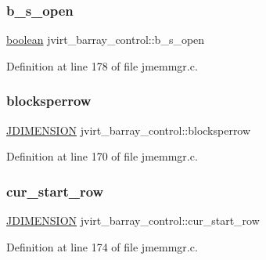 \mbox{\label{structjvirt__barray__control_a5b588561840b293882bcf69e690962b2}} 
\subsubsection{\texorpdfstring{b\_s\_open}{b\_s\_open}}
{\footnotesize\ttfamily \mbox{\hyperlink{jmorecfg_8h_a7c6368b321bd9acd0149b030bb8275ed}{boolean}} jvirt\+\_\+barray\+\_\+control\+::b\+\_\+s\+\_\+open}



Definition at line 178 of file jmemmgr.\+c.

\mbox{\label{structjvirt__barray__control_a6c148bce80b027c114ec7d37221cd175}} 
\subsubsection{\texorpdfstring{blocksperrow}{blocksperrow}}
{\footnotesize\ttfamily \mbox{\hyperlink{jmorecfg_8h_a04ed4674f6f1d0d50ec241531e38274f}{J\+D\+I\+M\+E\+N\+S\+I\+ON}} jvirt\+\_\+barray\+\_\+control\+::blocksperrow}



Definition at line 170 of file jmemmgr.\+c.

\mbox{\label{structjvirt__barray__control_ae1e7828cda2f39e8ffdd7e0cc4336f76}} 
\subsubsection{\texorpdfstring{cur\_start\_row}{cur\_start\_row}}
{\footnotesize\ttfamily \mbox{\hyperlink{jmorecfg_8h_a04ed4674f6f1d0d50ec241531e38274f}{J\+D\+I\+M\+E\+N\+S\+I\+ON}} jvirt\+\_\+barray\+\_\+control\+::cur\+\_\+start\+\_\+row}



Definition at line 174 of file jmemmgr.\+c.


